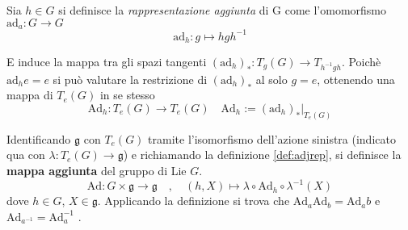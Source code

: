 \begin{definition}\label{def:adjrep}
   Sia $h \in G$ si definisce la \emph{rappresentazione aggiunta} di G come
   l'omomorfismo $ \mathrm{ad}_a : G \to G $
   $$
      \mathrm{ad}_h : g \mapsto h g h^{-1}
   $$
\end{definition}

E induce la mappa tra gli spazi tangenti $(\mathrm{ad}_h)_* : T_g(G) \to T_{h^{-1}gh}$.
Poichè $\mathrm{ad}_h e = e$ si può valutare la restrizione di $(\mathrm{ad}_h)_*$ al solo $g=e$,
ottenendo una mappa di $T_e(G)$ in se stesso
$$
   \mathrm{Ad}_h : T_e(G) \to T_e(G) \quad \mathrm{Ad}_h := (\mathrm{ad}_h)_* |_{T_e(G)}
$$

\begin{definition}
   Identificando $\mathfrak{g}$ con $T_e(G)$ tramite l'isomorfismo dell'azione sinistra
   (indicato qua con $\lambda : T_e(G) \to \mathfrak{g}$) e richiamando la definizione
   \ref{def:adjrep}, si definisce la \textbf{mappa aggiunta} del gruppo di Lie $G$.
   $$
      \mathrm{Ad} : G \times \mathfrak{g} \to \mathfrak{g} \quad , \quad
      (h,X) \mapsto \lambda \circ \mathrm{Ad}_h \circ \lambda^{-1}(X)
   $$
   dove $h \in G$, $X \in \mathfrak{g}$.
   Applicando la definizione si trova che $\mathrm{Ad}_a \mathrm{Ad}_b =
   \mathrm{Ad}_ab$ e $\mathrm{Ad}_{a^{-1}} = \mathrm{Ad}_a^{-1}$ .\\
\end{definition}
